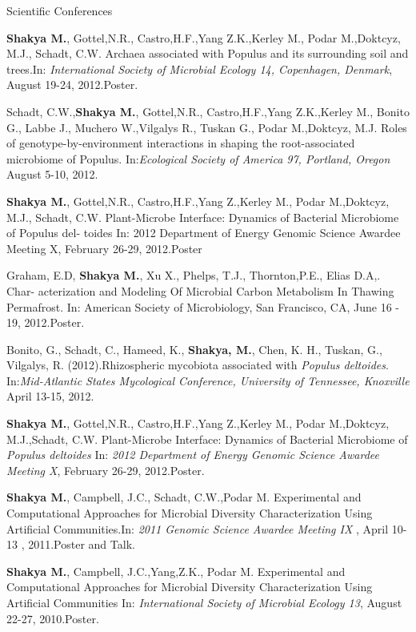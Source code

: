 \documentclass{resume} %
\begin{document}
\begin{rSection}{Scientific Conferences}
\item  \textbf{Shakya M.}, Gottel,N.R., Castro,H.F.,Yang Z.K.,Kerley M., Podar M.,Doktcyz, M.J., Schadt, C.W. Archaea associated with Populus and its surrounding soil and trees.In: \emph{International Society of Microbial Ecology 14, Copenhagen, Denmark}, August 19-24, 2012.Poster.

\item Schadt, C.W.,\textbf{Shakya M.}, Gottel,N.R., Castro,H.F.,Yang Z.K.,Kerley M., Bonito G., Labbe J., Muchero W.,Vilgalys R., Tuskan G., Podar M.,Doktcyz, M.J. Roles of genotype-by-environment interactions in shaping the root-associated microbiome of Populus. In:\emph{Ecological Society of America 97, Portland, Oregon} August 5-10, 2012.

\item \textbf{Shakya M.}, Gottel,N.R., Castro,H.F.,Yang Z.,Kerley M., Podar M.,Doktcyz, M.J., Schadt, C.W. Plant-Microbe Interface: Dynamics of Bacterial Microbiome of Populus del- toides In: 2012 Department of Energy Genomic Science Awardee Meeting X, February 26-29, 2012.Poster

\item Graham, E.D, \textbf{Shakya M.}, Xu X., Phelps, T.J., Thornton,P.E., Elias D.A,. Char- acterization and Modeling Of Microbial Carbon Metabolism In Thawing Permafrost. In: American Society of Microbiology, San Francisco, CA, June 16 - 19, 2012.Poster.


\item Bonito, G., Schadt, C., Hameed, K., \textbf{Shakya, M.}, Chen, K. H., Tuskan, G., Vilgalys, R. (2012).Rhizospheric mycobiota associated with \textit{Populus deltoides}. In:\emph{Mid-Atlantic States Mycological Conference, University of Tennessee, Knoxville} April 13-15, 2012.

\item \textbf{Shakya M.}, Gottel,N.R., Castro,H.F.,Yang Z.,Kerley M., Podar M.,Doktcyz, M.J.,Schadt, C.W. Plant-Microbe Interface: Dynamics of Bacterial Microbiome of \textit{Populus deltoides}  In: \emph{2012 Department of Energy Genomic Science Awardee Meeting X}, February 26-29, 2012.Poster.

\item \textbf{Shakya M.}, Campbell, J.C., Schadt, C.W.,Podar M. Experimental and Computational Approaches for Microbial Diversity Characterization Using Artificial Communities.In: \emph{2011 Genomic Science Awardee Meeting IX }, April 10-13 , 2011.Poster and Talk.

\item \textbf{Shakya M.}, Campbell, J.C.,Yang,Z.K., Podar M. Experimental and Computational Approaches for Microbial Diversity Characterization Using Artificial Communities In: \emph{International Society of Microbial Ecology 13}, August 22-27, 2010.Poster.

\end{rSection}
\end{document}
